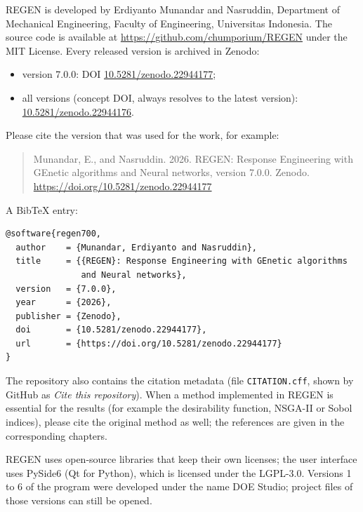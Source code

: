 REGEN is developed by Erdiyanto Munandar and Nasruddin, Department of Mechanical Engineering, Faculty of
Engineering, Universitas Indonesia. The source code is available at \url{https://github.com/chumporium/REGEN} under
the MIT License. Every released version is archived in Zenodo:
\begin{itemize}
  \item version 7.0.0: DOI \href{https://doi.org/10.5281/zenodo.22944177}{10.5281/zenodo.22944177};
  \item all versions (concept DOI, always resolves to the latest version):
        \href{https://doi.org/10.5281/zenodo.22944176}{10.5281/zenodo.22944176}.
\end{itemize}
Please cite the version that was used for the work, for example:

\begin{quote}
Munandar, E., and Nasruddin. 2026. REGEN: Response Engineering with GEnetic algorithms and Neural networks, version
7.0.0. Zenodo. \url{https://doi.org/10.5281/zenodo.22944177}
\end{quote}

A BibTeX entry:
\begin{verbatim}
@software{regen700,
  author    = {Munandar, Erdiyanto and Nasruddin},
  title     = {{REGEN}: Response Engineering with GEnetic algorithms
               and Neural networks},
  version   = {7.0.0},
  year      = {2026},
  publisher = {Zenodo},
  doi       = {10.5281/zenodo.22944177},
  url       = {https://doi.org/10.5281/zenodo.22944177}
}
\end{verbatim}
The repository also contains the citation metadata (file \texttt{CITATION.cff}, shown by GitHub as \emph{Cite this
repository}). When a method implemented in REGEN is essential for the results (for example the desirability
function, NSGA-II or Sobol indices), please cite the original method as well; the references are given in the
corresponding chapters.

REGEN uses open-source libraries that keep their own licenses; the user interface uses PySide6 (Qt for Python),
which is licensed under the LGPL-3.0. Versions 1 to 6 of the program were developed under the name DOE Studio;
project files of those versions can still be opened.

